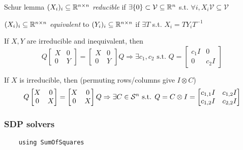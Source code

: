 \begin{frame}{Schur lemma}
  \noindent$(X_i)_i\subseteq \mathbb{R}^{n \times n}$ \emph{reducible} if $\exists \{0\} \subset \mathcal{V} \subseteq \mathbb{R}^n$ s.t. $\forall i, X_i \mathcal{V} \subseteq \mathcal{V}$

  \noindent$(X_i)_i\subseteq \mathbb{R}^{n \times n}$ \emph{equivalent} to $(Y_i)_i\subseteq \mathbb{R}^{n \times n}$ if $\exists T$ s.t. $X_i = TY_iT^{-1}$

  If $X, Y$ are irreducible and inequivalent, then
  $$
  Q
  \begin{bmatrix}
    X & 0\\
    0 & Y
  \end{bmatrix}
    =
  \begin{bmatrix}
    X & 0\\
    0 & Y
  \end{bmatrix}
  Q
  \Rightarrow
  \exists c_1, c_2 \text{ s.t. }
  Q =
  \begin{bmatrix}
    c_1 I & 0\\
    0 & c_2 I
  \end{bmatrix}
  $$

  If $X$ is irreducible, then (permuting rows/columns give
  $I \otimes C$)
  $$
  Q
  \begin{bmatrix}
    X & 0\\
    0 & X
  \end{bmatrix}
    =
  \begin{bmatrix}
    X & 0\\
    0 & X
  \end{bmatrix}
  Q
  \Rightarrow
  \exists C \in \mathcal{S}^{n} \text{ s.t. }
  Q = C \otimes I =
  \begin{bmatrix}
    c_{1,1}I & c_{1,2}I\\
    c_{1,2}I & c_{2,2}I
  \end{bmatrix}
  $$

\end{frame}

\begin{frame}[fragile]
  \frametitle{SDP solvers}
  \begin{verbatim}
    using SumOfSquares
  \end{verbatim}
\end{frame}
